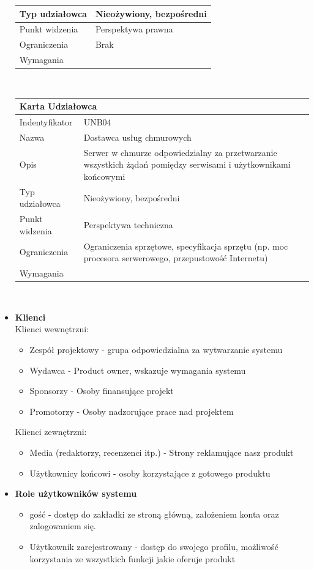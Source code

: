 \documentclass[a4paper,11pt]{report}
\begin{document}
\begin{itemize}
\begin{tabular}{|p{3cm}|p{11cm}|}
	\hline
	Typ udziałowca&Nieożywiony, bezpośredni\\
	\hline
	Punkt widzenia&Perspektywa prawna\\
	\hline
	Ograniczenia&Brak\\
	\hline
	Wymagania&\\
	\hline
	\end{tabular}\\
	\begin{tabular}{|p{3cm}|p{11cm}|}
	\hline
	\multicolumn{2}{|l|}{\textbf{Karta Udziałowca}}\\
	\hline
	Indentyfikator&UNB04\\
	\hline
	Nazwa&Dostawca usług chmurowych\\
	\hline
	Opis&Serwer w chmurze odpowiedzialny za przetwarzanie wszystkich żądań pomiędzy serwisami i użytkownikami końcowymi\\
	\hline
	Typ udziałowca&Nieożywiony, bezpośredni\\
	\hline
	Punkt widzenia&Perspektywa techniczna\\
	\hline
	Ograniczenia&Ograniczenia sprzętowe, specyfikacja sprzętu (np. moc procesora serwerowego, przepustowość Internetu)\\
	\hline
	Wymagania&\\
	\hline
	\end{tabular}\\
	\item \textbf{Klienci}\\
	Klienci wewnętrzni:
	\begin{itemize}
		\item Zespół projektowy - grupa odpowiedzialna za wytwarzanie systemu
		\item Wydawca - Product owner, wskazuje wymagania systemu
		\item Sponsorzy - Osoby finansujące projekt
		\item Promotorzy - Osoby nadzorujące  prace nad projektem
	\end{itemize}
	Klienci zewnętrzni:
	\begin{itemize}
		\item Media (redaktorzy, recenzenci itp.) - Strony reklamujące nasz produkt
		\item Użytkownicy końcowi - osoby korzystające z gotowego produktu
	\end{itemize}
	\item \textbf{Role użytkowników systemu}
	\begin{itemize}
		\item gość - dostęp do zakładki ze stroną główną, założeniem konta oraz zalogowaniem się.
		\item Użytkownik zarejestrowany - dostęp do swojego profilu, możliwość korzystania ze wszystkich funkcji jakie oferuje produkt
	\end{itemize}
\end{itemize}
\end{document}
